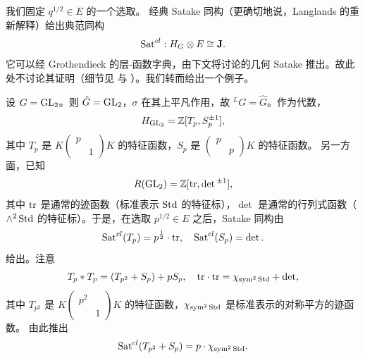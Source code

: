 我们固定 $q^{1/2}\in E$ 的一个选取。
经典 Satake 同构（更确切地说，Langlands 的重新解释）给出典范同构
\begin{equation}\label{Sat isom}
\operatorname{Sat}^{cl}: H_G\otimes E\cong \mathbf J.
\end{equation}
它可以经 Grothendieck 的层-函数字典，由下文将讨论的几何 Satake 推出。故此处不讨论其证明（细节见 \cite[\S 5.6]{Zh2} 与 \cite[\S 3.5]{XZ}）。我们转而给出一个例子。

\begin{ex}
设 $G={\operatorname{GL}}_2$。则 $\hat{G}={\operatorname{GL}}_2$，$\sigma$ 在其上平凡作用，故 ${^L}G=\hat{G}$。作为代数，
$$H_{{\operatorname{GL}}_2}={\mathbb Z}[T_p,S_p^{\pm 1}],$$
其中 $T_p$ 是 $K\begin{pmatrix}p&\\&1\end{pmatrix}K$ 的特征函数，$S_p$ 是 $\begin{pmatrix}p&\\&p\end{pmatrix}K$ 的特征函数。
另一方面，已知
$$R({\operatorname{GL}}_2)={\mathbb Z}[{\operatorname{tr}},\det{}^{\pm 1}],$$
其中 ${\operatorname{tr}}$ 是通常的迹函数（标准表示 $\operatorname{Std}$ 的特征标），$\det$ 是通常的行列式函数（$\wedge^2\operatorname{Std}$ 的特征标）。于是，在选取 $p^{1/2}\in E$ 之后，Satake 同构由
$$\operatorname{Sat}^{cl}(T_p)=p^{\frac{1}{2}}\cdot {\operatorname{tr}},\quad \operatorname{Sat}^{cl}(S_p)=\det.$$
给出。注意
\[T_p* T_p= (T_{p^2}+S_p)+pS_p,\quad {\operatorname{tr}}\cdot {\operatorname{tr}}= \chi_{\operatorname{sym}^2\operatorname{Std}}+\det,\]
其中 $T_{p^2}$ 是 $K\begin{pmatrix}p^2&\\&1\end{pmatrix}K$ 的特征函数，$\chi_{\operatorname{sym}^2\operatorname{Std}}$ 是标准表示的对称平方的迹函数。
由此推出
\begin{equation}\label{upper tr}
\operatorname{Sat}^{cl}(T_{p^2}+S_p)=p\cdot\chi_{\operatorname{sym}^2\operatorname{Std}}.
\end{equation}
\end{ex}
